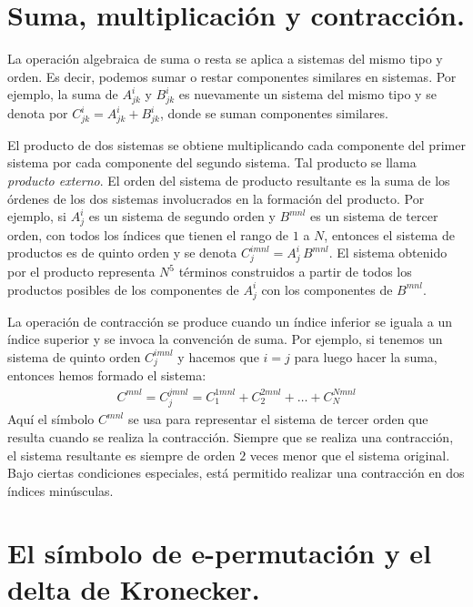 \section{Suma, multiplicación y contracción.}

La operación algebraica de suma o resta se aplica a sistemas del mismo tipo y orden. Es decir, podemos sumar o restar componentes similares en sistemas. Por ejemplo, la suma de $A_{jk}^{i}$ y $B_{jk}^{i}$ es nuevamente un sistema del mismo tipo y se denota por $C_{jk}^{i} = A_{jk}^{i} + B_{jk}^{i}$, donde se suman componentes similares.
\par
El producto de dos sistemas se obtiene multiplicando cada componente del primer sistema por cada componente del segundo sistema. Tal producto se llama \emph{producto externo}. El orden del sistema de producto resultante es la suma de los órdenes de los dos sistemas involucrados en la formación del producto. Por ejemplo, si $A_{j}^{i}$ es un sistema de segundo orden y $B^{mnl}$ es un sistema de tercer orden, con todos los índices que tienen el rango de $1$ a $N$, entonces el sistema de productos es de quinto orden y se denota $C_{j}^{imnl} = A_{j}^{i} \, B^{mnl}$. El sistema obtenido por el producto representa $N^{5}$ términos construidos a partir de todos los productos posibles de los componentes de $A_{j}^{i}$ con los componentes de $B^{mnl}$.
\par
La operación de contracción se produce cuando un índice inferior se iguala a un índice superior y se invoca la convención de suma. Por ejemplo, si tenemos un sistema de quinto orden $C_{j}^{imnl}$ y hacemos que $i = j$ para luego hacer la suma, entonces hemos formado el sistema:
\begin{align*}
C^{mnl} = C_{j}^{jmnl} = C_{1}^{1mnl} + C_{2}^{2mnl} + \ldots + C_{N}^{Nmnl}
\end{align*}
Aquí el símbolo $C^{mnl}$ se usa para representar el sistema de tercer orden que resulta cuando se realiza la contracción. Siempre que se realiza una contracción, el sistema resultante es siempre de orden $2$ veces menor que el sistema original. Bajo ciertas condiciones especiales, está permitido realizar una contracción en dos índices minúsculas. 

\section{El símbolo de e-permutación y el delta de Kronecker.}


